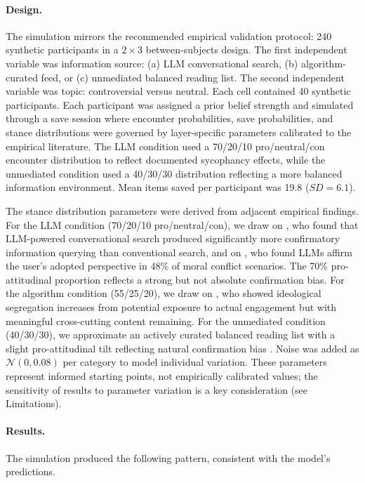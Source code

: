 \documentclass[12pt,a4paper]{article}
\begin{document}
\paragraph{Design.}
The simulation mirrors the recommended empirical validation protocol: 240 synthetic participants in a $2 \times 3$ between-subjects design.
The first independent variable was information source: (a) LLM conversational search, (b) algorithm-curated feed, or (c) unmediated balanced reading list.
The second independent variable was topic: controversial versus neutral.
Each cell contained 40 synthetic participants.
Each participant was assigned a prior belief strength and simulated through a save session where encounter probabilities, save probabilities, and stance distributions were governed by layer-specific parameters calibrated to the empirical literature.
The LLM condition used a 70/20/10 pro/neutral/con encounter distribution to reflect documented sycophancy effects, while the unmediated condition used a 40/30/30 distribution reflecting a more balanced information environment.
Mean items saved per participant was 19.8 ($SD = 6.1$).

The stance distribution parameters were derived from adjacent empirical findings.
For the LLM condition (70/20/10 pro/neutral/con), we draw on \citet{SharmaLiao2024}, who found that LLM-powered conversational search produced significantly more confirmatory information querying than conventional search, and on \citet{Chheda2025}, who found LLMs affirm the user's adopted perspective in 48\% of moral conflict scenarios.
The 70\% pro-attitudinal proportion reflects a strong but not absolute confirmation bias.
For the algorithm condition (55/25/20), we draw on \citet{GonzalezBailon2023}, who showed ideological segregation increases from potential exposure to actual engagement but with meaningful cross-cutting content remaining.
For the unmediated condition (40/30/30), we approximate an actively curated balanced reading list with a slight pro-attitudinal tilt reflecting natural confirmation bias \citep{Nickerson1998}.
Noise was added as $\mathcal{N}(0, 0.08)$ per category to model individual variation.
These parameters represent informed starting points, not empirically calibrated values; the sensitivity of results to parameter variation is a key consideration (see Limitations).

\paragraph{Results.}
The simulation produced the following pattern, consistent with the model's predictions.
\end{document}
